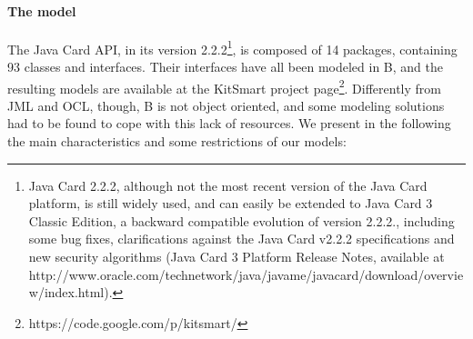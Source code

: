 \documentclass{llncs}
\begin{document}
\paragraph{The model}
The Java Card API, in its version 2.2.2\footnote{Java Card 2.2.2,
  although not the most recent version of the Java Card platform, is
  still widely used, and can easily be extended to Java Card 3 Classic
  Edition, a backward compatible evolution of version 2.2.2.,
  including some bug fixes, clarifications against the Java Card
  v2.2.2 specifications and new security algorithms (Java Card 3
  Platform Release Notes, available at
  http://www.oracle.com/technetwork/java/javame/javacard/download/overview/index.html).}, is composed of 14
packages, containing 93 classes and interfaces. Their interfaces have all been modeled in B,
and the resulting models are available at the KitSmart project
page\footnote{https://code.google.com/p/kitsmart/}.  Differently from
JML and OCL, though, B is not object oriented, and some modeling
solutions had to be found to cope with this lack of resources.  We
present in the following the main characteristics and some
restrictions of our models:
%
% 
%
\end{document}

